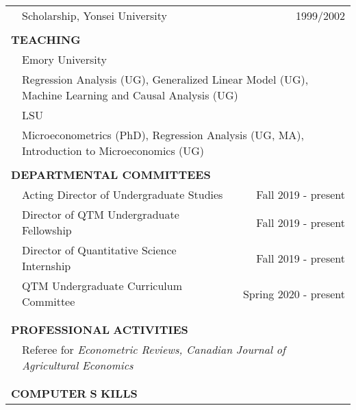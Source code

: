 \documentclass[10pt]{article}
\begin{document}
\begin{center}
\begin{tabular}{llllr}
& \multicolumn{3}{l}{Scholarship, Yonsei University} &
\multicolumn{1}{r}{1999/2002}\\
\multicolumn{5}{l}{} \\
\multicolumn{5}{l}{{\Large \textbf{T}}\textbf{EACHING}} \vspace{0.1cm}\\
& \multicolumn{4}{l}{Emory University}\vspace{0.1cm}\\
& \multicolumn{4}{l}{\quad Regression Analysis (UG), Generalized Linear Model (UG), Machine Learning and Causal Analysis (UG)}\vspace{0.1cm}\\
& \multicolumn{4}{l}{LSU}\vspace{0.1cm}\\
& \multicolumn{4}{l}{\quad Microeconometrics (PhD), Regression Analysis (UG, MA), Introduction to Microeconomics (UG)}\vspace{0.1cm}\\
\multicolumn{5}{l}{} \\
\multicolumn{5}{l}{{\Large \textbf{D}}\textbf{EPARTMENTAL COMMITTEES}} \vspace{0.1cm}\\
& \multicolumn{3}{l}{Acting Director of Undergraduate Studies}&\multicolumn{1}{r}{Fall 2019 - present}\\
& \multicolumn{3}{l}{Director of QTM Undergraduate Fellowship}&\multicolumn{1}{r}{Fall 2019 - present}\\
& \multicolumn{3}{l}{Director of Quantitative Science Internship}&\multicolumn{1}{r}{Fall 2019 - present}\\
& \multicolumn{3}{l}{QTM Undergraduate Curriculum Committee}&\multicolumn{1}{r}{Spring 2020 - present}\\
\vspace{0.1cm}\\
\multicolumn{5}{l}{} \\
\multicolumn{5}{l}{{\Large \textbf{P}}\textbf{ROFESSIONAL} {\Large \textbf{A}}\textbf{CTIVITIES}} \vspace{0.1cm}\\
& \multicolumn{4}{l}{Referee for \emph{Econometric Reviews, Canadian Journal of Agricultural Economics}}\\
\multicolumn{5}{l}{}\\\\
\multicolumn{5}{l}{{\Large \textbf{C}}\textbf{OMPUTER} {\Large \textbf{S}}%
\textbf{KILLS}} \vspace{0.1cm} \\

\end{tabular}
\end{center}
\end{document}
